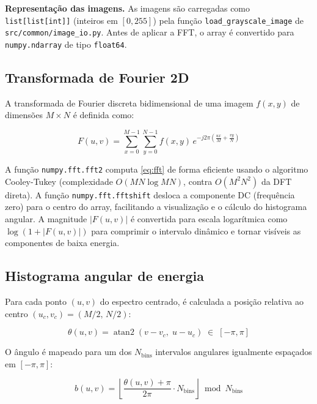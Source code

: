 \documentclass[12pt,a4paper]{article}
\newcommand{\arquivo}[1]{\nolinkurl{#1}}
\newcommand{\campo}[2]{\textbf{#1.} #2\par}
\begin{document}
\campo{Representação das imagens}{As imagens são carregadas como \texttt{list[list[int]]}
(inteiros em $[0,255]$) pela função \texttt{load\_grayscale\_image} de
\arquivo{src/common/image\_io.py}. Antes de aplicar a FFT, o array é convertido para
\texttt{numpy.ndarray} de tipo \texttt{float64}.}

\subsection{Transformada de Fourier 2D}

A transformada de Fourier discreta bidimensional de uma imagem $f(x,y)$ de dimensões
$M \times N$ é definida como:

\begin{equation}
  F(u,v) = \sum_{x=0}^{M-1} \sum_{y=0}^{N-1}
           f(x,y)\,e^{-j2\pi\!\left(\frac{ux}{M}+\frac{vy}{N}\right)}
  \label{eq:fft}
\end{equation}

A função \texttt{numpy.fft.fft2} computa \eqref{eq:fft} de forma eficiente usando o
algoritmo Cooley-Tukey (complexidade $O(MN\log MN)$, contra $O(M^2N^2)$ da DFT direta).
A função \texttt{numpy.fft.fftshift} desloca a componente DC (frequência zero) para o
centro do array, facilitando a visualização e o cálculo do histograma angular.
A magnitude $|F(u,v)|$ é convertida para escala logarítmica como $\log(1+|F(u,v)|)$
para comprimir o intervalo dinâmico e tornar visíveis as componentes de baixa energia.

\subsection{Histograma angular de energia}

Para cada ponto $(u,v)$ do espectro centrado, é calculada a posição relativa ao
centro $(u_c, v_c) = (M/2,\, N/2)$:

\begin{equation}
  \theta(u,v) = \operatorname{atan2}(v - v_c,\; u - u_c) \;\in\; [-\pi, \pi]
\end{equation}

O ângulo é mapeado para um dos $N_{\text{bins}}$ intervalos angulares igualmente
espaçados em $[-\pi, \pi]$:

\begin{equation}
  b(u,v) = \left\lfloor \frac{\theta(u,v) + \pi}{2\pi} \cdot N_{\text{bins}} \right\rfloor
           \bmod N_{\text{bins}}
\end{equation}
\end{document}
